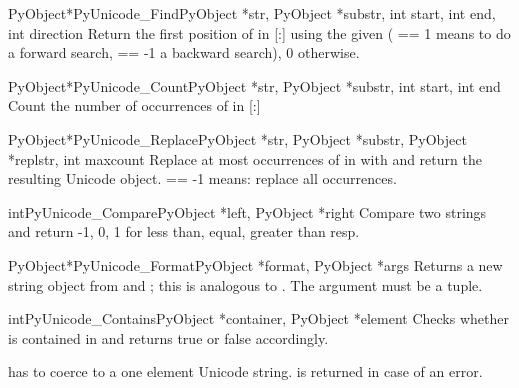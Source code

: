 \documentclass{manual}
\begin{document}
\begin{cfuncdesc}{PyObject*}{PyUnicode_Find}{PyObject *str,
                                                  PyObject *substr,
                                                  int start,
                                                  int end,
                                                  int direction}
Return the first position of  in
[:] using the given 
( == 1 means to do a forward search,
 == -1 a backward search), 0 otherwise.
\end{cfuncdesc}

\begin{cfuncdesc}{PyObject*}{PyUnicode_Count}{PyObject *str,
                                                  PyObject *substr,
                                                  int start,
                                                  int end}
Count the number of occurrences of  in
[:]
\end{cfuncdesc}

\begin{cfuncdesc}{PyObject*}{PyUnicode_Replace}{PyObject *str,
                                                PyObject *substr,
                                                PyObject *replstr,
                                                int maxcount}
Replace at most  occurrences of  in
 with  and return the resulting Unicode object.
 == -1 means: replace all occurrences.
\end{cfuncdesc}

\begin{cfuncdesc}{int}{PyUnicode_Compare}{PyObject *left, PyObject *right}
Compare two strings and return -1, 0, 1 for less than, equal,
greater than resp.
\end{cfuncdesc}

\begin{cfuncdesc}{PyObject*}{PyUnicode_Format}{PyObject *format,
                                              PyObject *args}
Returns a new string object from  and ; this is
analogous to .  The
 argument must be a tuple.
\end{cfuncdesc}

\begin{cfuncdesc}{int}{PyUnicode_Contains}{PyObject *container,
                                           PyObject *element}
Checks whether  is contained in  and
returns true or false accordingly.

 has to coerce to a one element Unicode string.  is
returned in case of an error.
\end{cfuncdesc}
\end{document}
